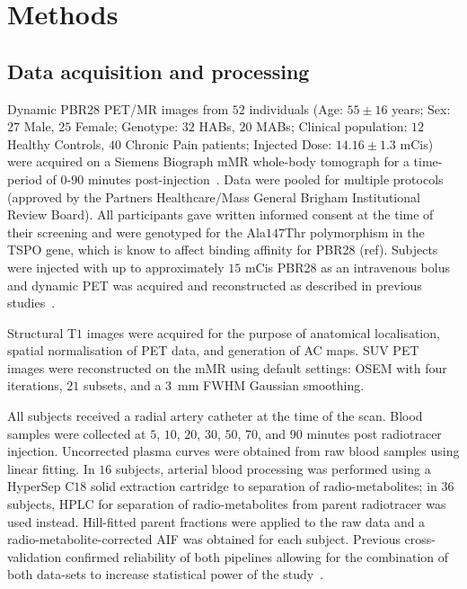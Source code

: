 
\section{Methods} \label{sec:methods}    
    \subsection{Data acquisition and processing}\label{sec:dataproc}
        Dynamic \gls{PBR28} \gls{PET}/\gls{MR} images from $52$ individuals (Age: $55 \pm 16$ years; Sex: $27$ Male, $25$ Female; Genotype: $32$ \glspl{HAB}, $20$ \glspl{MAB}; Clinical population: $12$ Healthy Controls, $40$ Chronic Pain patients; Injected Dose: $14.16 \pm 1.3$ \glspl{mCi}) were acquired on a Siemens Biograph mMR whole-body tomograph for a time-period of $0$-$90$ minutes post-injection~\cite{Delso2011PerformanceScanner}. Data were pooled for multiple protocols (approved by the Partners Healthcare/Mass General Brigham Institutional Review Board).  All participants gave written informed consent at the time of their screening and were genotyped for the Ala$147$Thr polymorphism in the \gls{TSPO} gene, which is know to affect binding affinity for \gls{PBR28} (ref). Subjects were injected with up to approximately $15$ \glspl{mCi} \gls{PBR28} as an intravenous bolus and dynamic \gls{PET} was acquired and reconstructed as described in previous studies~\cite{Alshelh2020In-vivoIllness}.
        
        Structural T$1$ images were acquired for the purpose of anatomical localisation, spatial normalisation of \gls{PET} data, and generation of \gls{AC} maps. \gls{SUV} \gls{PET} images were reconstructed on the mMR using default settings: \gls{OSEM} with four iterations, $21$ subsets, and a \SI{3}{\milli\meter} \gls{FWHM} Gaussian smoothing.
        
        All subjects received a radial artery catheter at the time of the scan. Blood samples were collected at $5$, $10$, $20$, $30$, $50$, $70$, and $90$ minutes post radiotracer injection. Uncorrected plasma curves were obtained from raw blood samples using linear fitting. In $16$ subjects, arterial blood processing was performed using a HyperSep C$18$ solid extraction cartridge to separation of radio-metabolites; in $36$ subjects, \gls{HPLC} for separation of radio-metabolites from parent radiotracer was used instead. Hill-fitted parent fractions were applied to the raw data and a radio-metabolite-corrected \gls{AIF} was obtained for each subject. Previous cross-validation confirmed reliability of both pipelines allowing for the combination of both data-sets to increase statistical power of the study~\cite{Brusaferri2022ThePandemic}. 
        
